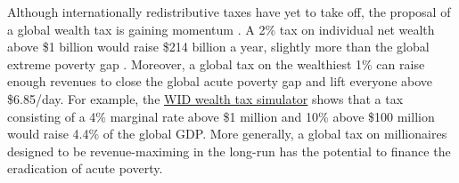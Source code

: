 
Although internationally redistributive taxes have yet to take off, the proposal of a global wealth tax is gaining momentum \citep{piketty_brief_2022}. A 2\% tax on individual net wealth above \$1 billion would raise \$214 billion a year, slightly more than the global extreme poverty gap \citep{alstadsaeter_global_2024}. Moreover, a global tax on the wealthiest 1\% can raise enough revenues to close the global acute poverty gap and lift everyone above \$6.85/day. For example, the \href{https://wid.world/world-wealth-tax-simulator}{WID wealth tax simulator} shows that a tax consisting of a 4\% marginal rate above \$1 million and 10\% above \$100 million would raise 4.4\% of the global GDP. More generally, a global tax on millionaires designed to be revenue-maximing in the long-run has the potential to finance the eradication of acute poverty. 

